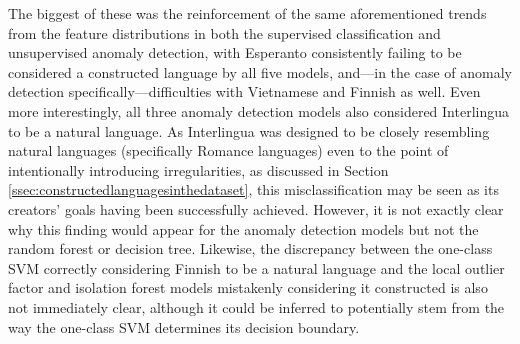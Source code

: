 \documentclass[12pt,a4paper]{article}
\numberwithin{figure}{section}
\numberwithin{table}{section}
\numberwithin{definition}{section}
\begin{document}
The biggest of these was the reinforcement of the same aforementioned trends from the feature distributions in both the supervised classification and unsupervised anomaly detection, with Esperanto consistently failing to be considered a constructed language by all five models, and---in the case of anomaly detection specifically---difficulties with Vietnamese and Finnish as well. Even more interestingly, all three anomaly detection models also considered Interlingua to be a natural language. As Interlingua was designed to be closely resembling natural languages (specifically Romance languages) even to the point of intentionally introducing irregularities, as discussed in Section \ref{ssec:constructedlanguagesinthedataset}, this misclassification may be seen as its creators' goals having been successfully achieved. However, it is not exactly clear why this finding would appear for the anomaly detection models but not the random forest or decision tree. Likewise, the discrepancy between the one-class SVM correctly considering Finnish to be a natural language and the local outlier factor and isolation forest models mistakenly considering it constructed is also not immediately clear, although it could be inferred to potentially stem from the way the one-class SVM determines its decision boundary. %
\end{document}
